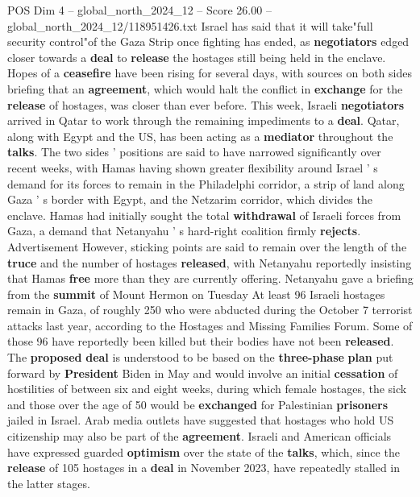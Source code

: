 \begin{textsample}{POS Dim 4 – global\_north\_2024\_12 – Score 26.00 – global\_north\_2024\_12/118951426.txt}  \label{ex:f4_pos_304}
Israel has said that it will take"full security control"of the Gaza Strip once fighting has ended, as \textbf{negotiators} edged closer towards a \textbf{deal} to \textbf{release} the hostages still being held in the enclave.
Hopes of a \textbf{ceasefire} have been rising for several days, with sources on both sides briefing that an \textbf{agreement}, which would halt the conflict in \textbf{exchange} for the \textbf{release} of hostages, was closer than ever before.
This week, Israeli \textbf{negotiators} arrived in Qatar to work through the remaining impediments to a \textbf{deal}.
Qatar, along with Egypt and the US, has been acting as a \textbf{mediator} throughout the \textbf{talks}.
The two sides ' positions are said to have narrowed significantly over recent weeks, with Hamas having shown greater flexibility around Israel ' s demand for its forces to remain in the Philadelphi corridor, a strip of land along Gaza ' s border with Egypt, and the Netzarim corridor, which divides the enclave.
Hamas had initially sought the total \textbf{withdrawal} of Israeli forces from Gaza, a demand that Netanyahu ' s hard-right coalition firmly \textbf{rejects}.
Advertisement However, sticking points are said to remain over the length of the \textbf{truce} and the number of hostages \textbf{released}, with Netanyahu reportedly insisting that Hamas \textbf{free} more than they are currently offering.
Netanyahu gave a briefing from the \textbf{summit} of Mount Hermon on Tuesday At least 96 Israeli hostages remain in Gaza, of roughly 250 who were abducted during the October 7 terrorist attacks last year, according to the Hostages and Missing Families Forum.
Some of those 96 have reportedly been killed but their bodies have not been \textbf{released}.
The \textbf{proposed} \textbf{deal} is understood to be based on the \textbf{three-phase} \textbf{plan} put forward by \textbf{President} Biden in May and would involve an initial \textbf{cessation} of hostilities of between six and eight weeks, during which female hostages, the sick and those over the age of 50 would be \textbf{exchanged} for Palestinian \textbf{prisoners} jailed in Israel.
Arab media outlets have suggested that hostages who hold US citizenship may also be part of the \textbf{agreement}.
Israeli and American officials have expressed guarded \textbf{optimism} over the state of the \textbf{talks}, which, since the \textbf{release} of 105 hostages in a \textbf{deal} in November 2023, have repeatedly stalled in the latter stages.

\end{textsample}
